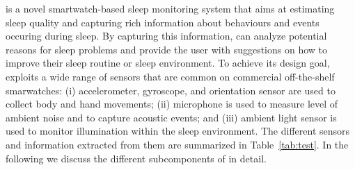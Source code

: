 

\systemname is a novel smartwatch-based sleep monitoring system that aims at estimating sleep quality and capturing rich information about behaviours and events occuring during sleep. By capturing this information, \systemname can analyze potential reasons for sleep problems and provide the user with suggestions on how to improve their sleep routine or sleep environment. To achieve its design goal, \systemname exploits a wide range of sensors that are common on commercial off-the-shelf smarwatches: (i) accelerometer, gyroscope, and orientation sensor are used to collect body and hand movements; (ii) microphone is used to measure level of ambient noise and to capture acoustic events; and (iii) ambient light sensor is used to monitor illumination within the sleep environment. The different sensors and information extracted from them are summarized in Table~\ref{tab:test}. In the following we discuss the different subcomponents of \systemname in detail. 


